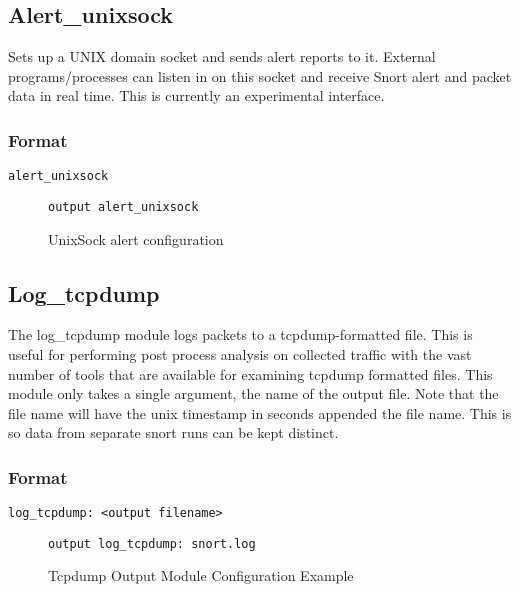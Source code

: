 \documentclass[english]{report}
\begin{document}
\subsection{Alert\_unixsock}

Sets up a UNIX domain socket and sends alert reports to it. External
programs/processes can listen in on this socket and receive Snort
alert and packet data in real time. This is currently an experimental
interface.


\subsubsection{Format}

\begin{verbatim}
alert_unixsock
\end{verbatim}
%
\begin{figure}[!hbpt]
\begin{verbatim}
output alert_unixsock
\end{verbatim}

\caption{\label{unixsock configuration}UnixSock alert configuration}
\end{figure}



\subsection{Log\_tcpdump}

The log\_tcpdump module logs packets to a tcpdump-formatted file.
This is useful for performing post process analysis on collected
traffic with the vast number of tools that are available for examining
tcpdump formatted files. This module only takes a single argument, the
name of the output file. Note that the file name will have the unix
timestamp in seconds appended the file name. This is so data from
separate snort runs can be kept distinct.


\subsubsection{Format}

\begin{verbatim}
log_tcpdump: <output filename>
\end{verbatim}
%
\begin{figure}[!hbpt]
\begin{verbatim}
output log_tcpdump: snort.log
\end{verbatim}

\caption{\label{tcpdump output configuration}Tcpdump Output Module Configuration
Example}
\end{figure}
\end{document}
